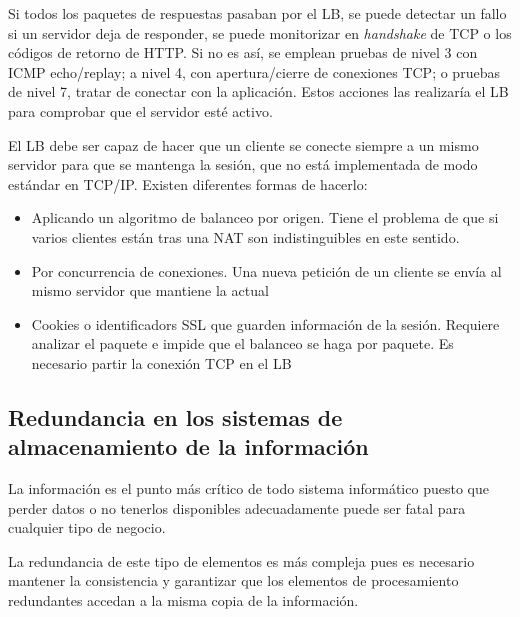 Si todos los paquetes de respuestas pasaban por el LB, se puede detectar un fallo si un servidor deja de responder, se puede monitorizar en \textit{handshake} de TCP o los códigos de retorno de HTTP. Si no es así, se emplean pruebas de nivel 3 con ICMP echo/replay; a nivel 4, con apertura/cierre de conexiones TCP; o pruebas de nivel 7, tratar de conectar con la aplicación. Estos acciones las realizaría el LB para comprobar que el servidor esté activo.

El LB debe ser capaz de hacer que un cliente se conecte siempre a un mismo servidor para que se mantenga la sesión, que no está implementada de modo estándar en TCP/IP. Existen diferentes formas de hacerlo:
\begin{itemize}
\item Aplicando un algoritmo de balanceo por origen. Tiene el problema de que si varios clientes están tras una NAT son indistinguibles en este sentido.
\item Por concurrencia de conexiones. Una nueva petición de un cliente se envía al mismo servidor que mantiene la actual
\item Cookies o identificadors SSL que guarden información de la sesión. Requiere analizar el paquete e impide que el balanceo se haga por paquete. Es necesario partir la conexión TCP en el LB
\end{itemize}

\subsection{Redundancia en los sistemas de almacenamiento de la información}
La información es el punto más crítico de todo sistema informático puesto que perder datos o no tenerlos disponibles adecuadamente puede ser fatal para cualquier tipo de negocio.

La redundancia de este tipo de elementos es más compleja pues es necesario mantener la consistencia y garantizar que los elementos de procesamiento redundantes accedan a la misma copia de la información.


